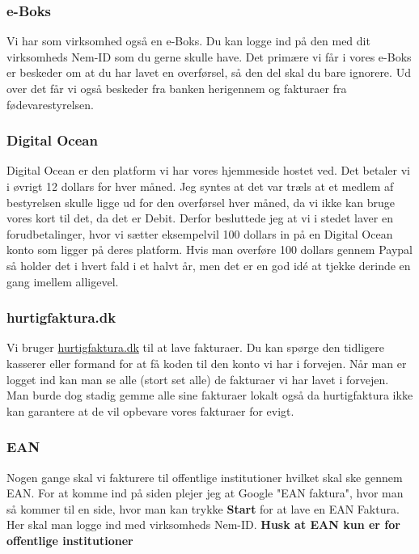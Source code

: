 \subsubsection{e-Boks}
Vi har som virksomhed også en e-Boks. Du kan logge ind på den med dit virksomheds Nem-ID som du gerne skulle have. Det primære vi får i vores e-Boks er beskeder om at du har lavet en overførsel, så den del skal du bare ignorere. Ud over det får vi også beskeder fra banken herigennem og fakturaer fra fødevarestyrelsen.
\subsubsection{Digital Ocean}
Digital Ocean er den platform vi har vores hjemmeside hostet ved. Det betaler vi i øvrigt 12 dollars for hver måned. Jeg syntes at det var træls at et medlem af bestyrelsen skulle ligge ud for den overførsel hver måned, da vi ikke kan bruge vores kort til det, da det er Debit. Derfor besluttede jeg at vi i stedet laver en forudbetalinger, hvor vi sætter eksempelvil 100 dollars in på en Digital Ocean konto som ligger på deres platform. Hvis man overføre 100 dollars gennem Paypal så holder det i hvert fald i et halvt år, men det er en god idé at tjekke derinde en gang imellem alligevel.
\subsubsection{hurtigfaktura.dk}
Vi bruger \href{https://www.hurtigfaktura.dk/}{hurtigfaktura.dk} til at lave fakturaer. Du kan spørge den tidligere kasserer eller formand for at få koden til den konto vi har i forvejen. Når man er logget ind kan man se alle (stort set alle) de fakturaer vi har lavet i forvejen. Man burde dog stadig gemme alle sine fakturaer lokalt også da hurtigfaktura ikke kan garantere at de vil opbevare vores fakturaer for evigt.
\subsubsection{EAN}
Nogen gange skal vi fakturere til offentlige institutioner hvilket skal ske gennem EAN. For at komme ind på siden plejer jeg at Google "EAN faktura", hvor man så kommer til en side, hvor man kan trykke \textbf{Start} for at lave en EAN Faktura. Her skal man logge ind med virksomheds Nem-ID. \textbf{Husk at EAN kun er for offentlige institutioner}

